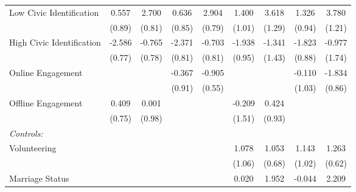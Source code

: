 \begin{table}[htbp]
\begin{tabular}{l*{8}{c}}
\hspace{0.25cm} Low Civic Identification&0.557         &2.700\sym{**} &0.636         &2.904\sym{**} &1.400         &3.618\sym{**} &1.326         &3.780\sym{**} \\
                              &(0.89)         &(0.81)         &(0.85)         &(0.79)         &(1.01)         &(1.29)         &(0.94)         &(1.21)         \\
\hspace{0.25cm} High Civic Identification&-2.586\sym{**} &-0.765         &-2.371\sym{**} &-0.703         &-1.938\sym{^+} &-1.341         &-1.823\sym{*}  &-0.977         \\
                              &(0.77)         &(0.78)         &(0.81)         &(0.81)         &(0.95)         &(1.43)         &(0.88)         &(1.74)         \\
\hspace{0.25cm} Online Engagement&              &              &-0.367         &-0.905         &              &              &-0.110         &-1.834\sym{*}  \\
                              &              &              &(0.91)         &(0.55)         &              &              &(1.03)         &(0.86)         \\
\hspace{0.25cm} Offline Engagement&0.409         &0.001         &              &              &-0.209         &0.424         &              &              \\
                              &(0.75)         &(0.98)         &              &              &(1.51)         &(0.93)         &              &              \\
\emph{Controls:}              &              &              &              &              &              &              &              &              \\
\hspace{0.25cm} Volunteering  &              &              &              &              &1.078         &1.053         &1.143         &1.263\sym{^+} \\
                              &              &              &              &              &(1.06)         &(0.68)         &(1.02)         &(0.62)         \\
\hspace{0.25cm} Marriage Status&              &              &              &              &0.020         &1.952\sym{^+} &-0.044         &2.209         \\

\end{tabular}
\end{table}
